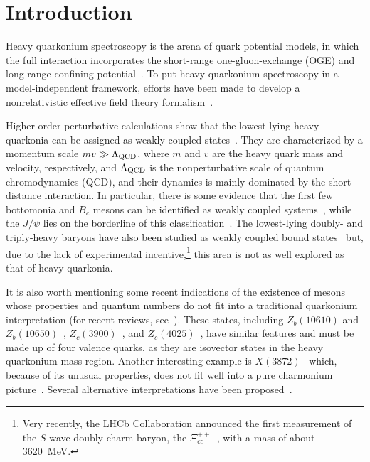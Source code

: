 \documentclass[twocolumn,showpacs,superscriptaddress,preprintnumbers,nofootinbib,prd]{revtex4-1}
\begin{document}

\maketitle

\section{Introduction}

Heavy quarkonium spectroscopy is the arena of quark potential models, in which
the full interaction incorporates the short-range one-gluon-exchange (OGE) and
long-range confining
potential~\cite{Eichten:1978tg,Richardson:1978bt,Buchmuller:1980su,Godfrey:1985xj,Barnes:2005pb}.
To put heavy quarkonium spectroscopy in a model-independent framework, efforts have
been made to develop a nonrelativistic effective field theory
formalism~\cite{Pineda:1997bj,Brambilla:1999xf,Brambilla:2004jw}.

Higher-order perturbative calculations show that the lowest-lying heavy
quarkonia can be assigned as weakly coupled
states~\cite{Pineda:1997hz,Brambilla:1999xj,Kniehl:2002br}. They are
characterized by a momentum scale $mv \gg \Lambda_{\rm QCD}$, where $m$ and $v$
are the heavy quark mass and velocity, respectively, and $\Lambda_{\rm QCD}$ is the
nonperturbative scale of quantum chromodynamics (QCD), and their dynamics is
mainly dominated by the short-distance interaction. In particular, there is
some evidence that the first few bottomonia and $B_c$ mesons can be identified
as weakly coupled
systems~\cite{Titard:1993nn,Brambilla:2000db,Brambilla:2001fw}, while the
$J/\psi$ lies on the borderline of this classification~\cite{Brambilla:2004jw}.
The lowest-lying doubly- and triply-heavy baryons have also been studied as weakly
coupled bound states~\cite{Brambilla:2005yk,Jia:2006gw} but, due to the lack of
experimental incentive,\footnote{Very recently, the LHCb Collaboration announced the first
measurement of the $S$-wave doubly-charm baryon, the
$\Xi_{cc}^{++}$~\cite{Aaij:2017ueg}, with a mass of about 3620~MeV.}
this area is not as well explored as that of heavy
quarkonia.

It is also worth mentioning some recent indications of the existence of
mesons whose properties and quantum numbers do not fit into a traditional
quarkonium interpretation (for recent reviews,
see~\cite{Nakamura:2010zzi,Brambilla:2014jmp,Chen:2016qju,Lebed:2016hpi,
Esposito:2016noz,Guo:2017jvc,Ali:2017jda,Olsen:2017bmm}).
These states, including $Z_b(10610)$ and $Z_b(10650)$~\cite{Bondar},
$Z_c(3900)$~\cite{Ablikim,Liu}, and $Z_c(4025)$~\cite{Ablikim2},  have similar
features and must be made up of four valence quarks, as they are isovector
states in the heavy quarkonium mass region.
Another interesting example is $X(3872)$~\cite{Choi:2003ue} which, because
of its unusual properties, does not fit well into a pure charmonium
picture~\cite{Godfrey:1985xj,Eichten:1978tg,Barnes:2005pb}.
Several alternative interpretations have been
proposed~\cite{Hanhart:2007yq,Baru:2011rs,Swanson:2003tb,Pennington:2007xr,
Li:2009ad,Danilkin:2010cc,charmonium,Maiani:2004vq}.
\end{document}
